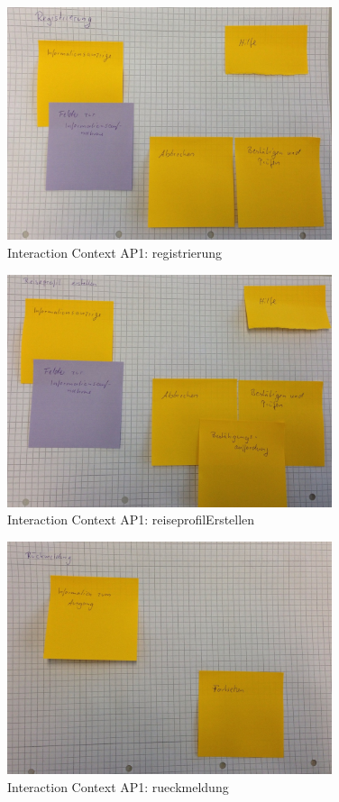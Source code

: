 \begin{figure}[H]
\centering
\includegraphics[width=0.85\textwidth]{./images/abstract/version1/registrierung.JPG}
\caption{Interaction Context AP1: registrierung}
\label{interfaceContents28}
\end{figure}

\begin{figure}[H]
\centering
\includegraphics[width=0.85\textwidth]{./images/abstract/version1/reiseprofilErstellen.JPG}
\caption{Interaction Context AP1: reiseprofilErstellen}
\label{interfaceContents29}
\end{figure}

\begin{figure}[H]
\centering
\includegraphics[width=0.85\textwidth]{./images/abstract/version1/rueckmeldung.JPG}
\caption{Interaction Context AP1: rueckmeldung}
\label{interfaceContents30}
\end{figure}

